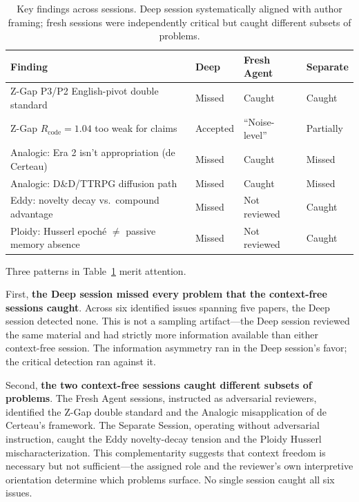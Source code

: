\documentclass[12pt]{article}
\begin{document}
\begin{table}[htbp]
\centering
\caption{Key findings across sessions. Deep session systematically aligned with author framing; fresh sessions were independently critical but caught different subsets of problems.}
\label{tab:findings}
\begin{tabular}{p{5cm}lll}
\toprule
Finding & Deep & Fresh Agent & Separate \\
\midrule
Z-Gap P3/P2 English-pivot double standard & Missed & Caught & Caught \\
Z-Gap $R_{\text{code}}=1.04$ too weak for claims & Accepted & ``Noise-level'' & Partially \\
Analogic: Era 2 isn't appropriation (de Certeau) & Missed & Caught & Missed \\
Analogic: D\&D/TTRPG diffusion path & Missed & Caught & Missed \\
Eddy: novelty decay vs.\ compound advantage & Missed & Not reviewed & Caught \\
Ploidy: Husserl epoch\'e $\neq$ passive memory absence & Missed & Not reviewed & Caught \\
\bottomrule
\end{tabular}
\end{table}

Three patterns in Table~\ref{tab:findings} merit attention.

First, \textbf{the Deep session missed every problem that the context-free sessions caught}. Across six identified issues spanning five papers, the Deep session detected none. This is not a sampling artifact---the Deep session reviewed the same material and had strictly more information available than either context-free session. The information asymmetry ran in the Deep session's favor; the critical detection ran against it.

Second, \textbf{the two context-free sessions caught different subsets of problems}. The Fresh Agent sessions, instructed as adversarial reviewers, identified the Z-Gap double standard and the Analogic misapplication of de Certeau's framework. The Separate Session, operating without adversarial instruction, caught the Eddy novelty-decay tension and the Ploidy Husserl mischaracterization. This complementarity suggests that context freedom is necessary but not sufficient---the assigned role and the reviewer's own interpretive orientation determine which problems surface. No single session caught all six issues.
\end{document}
